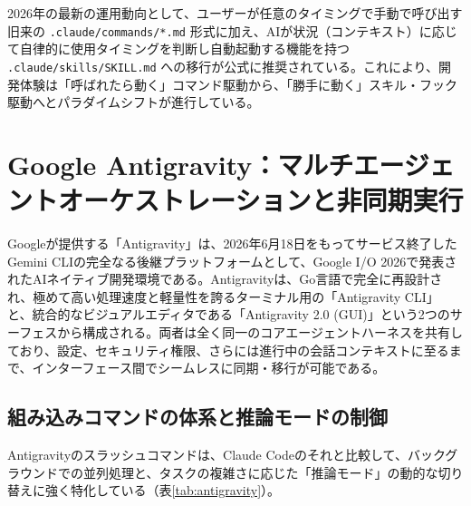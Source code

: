 \documentclass[a4paper,11pt]{ltjsarticle}
\newcommand{\cmd}[1]{\texttt{#1}}
\begin{document}
2026年の最新の運用動向として、ユーザーが任意のタイミングで手動で呼び出す旧来の \cmd{.claude/commands/*.md} 形式に加え、AIが状況（コンテキスト）に応じて自律的に使用タイミングを判断し自動起動する機能を持つ \cmd{.claude/skills/SKILL.md} への移行が公式に推奨されている。これにより、開発体験は「呼ばれたら動く」コマンド駆動から、「勝手に動く」スキル・フック駆動へとパラダイムシフトが進行している\cite{r9}。

\section{Google Antigravity：マルチエージェントオーケストレーションと非同期実行}

Googleが提供する「Antigravity」は、2026年6月18日をもってサービス終了したGemini CLIの完全なる後継プラットフォームとして、Google I/O 2026で発表されたAIネイティブ開発環境である\cite{r23}。Antigravityは、Go言語で完全に再設計され、極めて高い処理速度と軽量性を誇るターミナル用の「Antigravity CLI」と、統合的なビジュアルエディタである「Antigravity 2.0 (GUI)」という2つのサーフェスから構成される\cite{r23}。両者は全く同一のコアエージェントハーネスを共有しており、設定、セキュリティ権限、さらには進行中の会話コンテキストに至るまで、インターフェース間でシームレスに同期・移行が可能である\cite{r26}。

\subsection{組み込みコマンドの体系と推論モードの制御}

Antigravityのスラッシュコマンドは、Claude Codeのそれと比較して、バックグラウンドでの並列処理と、タスクの複雑さに応じた「推論モード」の動的な切り替えに強く特化している（表\ref{tab:antigravity}）。
\end{document}
